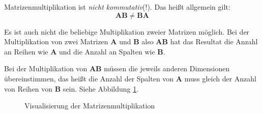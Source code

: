 Matrizenmultiplikation ist \emph{nicht kommutativ}(!). Das heißt allgemein gilt:
\begin{equation}
    \mathbf{AB} \neq \mathbf{BA}
\end{equation}

Es ist auch nicht die beliebige Multiplikation zweier Matrizen möglich. Bei der Multiplikation von zwei Matrizen $\mathbf{A}$ und $\mathbf{B}$ also $\mathbf{AB}$ hat das Resultat die Anzahl an Reihen wie $\mathbf{A}$ und die Anzahl an Spalten wie $\mathbf{B}$. 

Bei der Multiplikation von $\mathbf{AB}$ müssen die jeweils anderen Dimensionen übereinstimmen, das heißt die Anzahl der Spalten von $\mathbf{A}$ muss gleich der Anzahl von Reihen von $\mathbf{B}$ sein. Siehe Abbildung \ref{fig:matrixMultDims}.


\begin{figure}[H]
\centering
{}
\caption{Visualisierung der Matrizenmultiplikation}
    \label{fig:matrixMultDims}
\end{figure}

